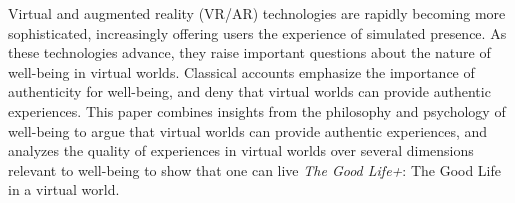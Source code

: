 Virtual and augmented reality (VR/AR) technologies are rapidly becoming more
sophisticated, increasingly offering users the experience of
simulated presence. As these technologies advance, they raise important
questions about the nature of well-being in virtual worlds. Classical accounts
emphasize the importance of authenticity for well-being, and deny that virtual
worlds can provide authentic experiences. This paper combines insights from
the philosophy and psychology of well-being to argue that virtual worlds
can provide authentic experiences, and analyzes the quality of experiences in
virtual worlds over several dimensions relevant to well-being to show that one
can live \emph{The Good Life+}: The Good Life in a virtual world.
